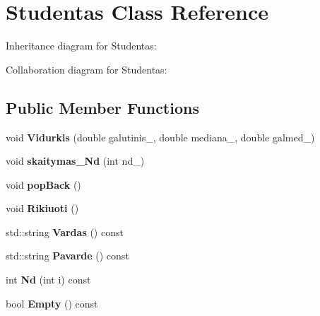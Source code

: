 \hypertarget{classStudentas}{}\section{Studentas Class Reference}
\label{classStudentas}


Inheritance diagram for Studentas\+:


Collaboration diagram for Studentas\+:
\subsection*{Public Member Functions}
\begin{DoxyCompactItemize}
\item 
\mbox{\label{classStudentas_a1661dddff7feabcce8f1df8969a3ea07}} 
void {\bfseries Vidurkis} (double galutinis\+\_\+, double mediana\+\_\+, double galmed\+\_\+)
\item 
\mbox{\label{classStudentas_a58532032dcdea5bc73462869f4f7294a}} 
void {\bfseries skaitymas\+\_\+\+Nd} (int nd\+\_\+)
\item 
\mbox{\label{classStudentas_a9ef6dff4a264d6882bc18f0f176ac188}} 
void {\bfseries pop\+Back} ()
\item 
\mbox{\label{classStudentas_ae3efe6b77283f7d6597724ed22cf96e8}} 
void {\bfseries Rikiuoti} ()
\item 
\mbox{\label{classStudentas_a065b346a1d75bcf902faf039e3d2273c}} 
std\+::string {\bfseries Vardas} () const
\item 
\mbox{\label{classStudentas_a11c273f1dbe9437e224628fe580e4609}} 
std\+::string {\bfseries Pavarde} () const
\item 
\mbox{\label{classStudentas_a114b0838a916cf26bdfbad87d774d823}} 
int {\bfseries Nd} (int i) const
\item 
\mbox{\label{classStudentas_acfefdf28b306a7639b0addc66c773f6a}} 
bool {\bfseries Empty} () const
\item 
\mbox{\label{classStudentas_a522dfa6e2a0ff1f732873b77b74482b2}} 

\end{DoxyCompactItemize}
